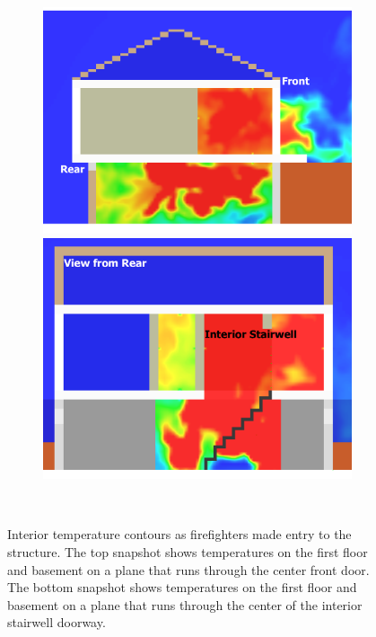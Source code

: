 \documentclass[12pt,oneside]{book}
\begin{document}
\begin{figure}[!ht]
\begin{subfigure}{0.65\textwidth}
\includegraphics[trim = 0in 0in 0in 0in, clip=true, width=\textwidth]{../Figures/side_view_142s} \\
\includegraphics[trim = 0in 0in 0in 0in, clip=true, width=\textwidth]{../Figures/stair_view_142s} 
\end{subfigure}
\begin{subfigure}{0.35\textwidth}

 \\
\end{subfigure}
\caption[Interior temperature contours as firefighters made entry to the structure]
{Interior temperature contours as firefighters made entry to the structure. The top snapshot shows temperatures on the first floor and basement on a plane that runs through the center front door. The bottom snapshot shows temperatures on the first floor and basement on a plane that runs through the center of the interior stairwell doorway.}
\label{fig:int_temp_142s}
\end{figure}
\end{document}

